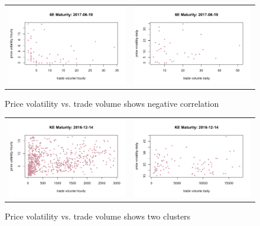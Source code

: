 \documentclass[12pt]{article}
\begin{document}
\begin{figure}[H]
	\begin{center}
		\begin{tabular}{ll}
		\includegraphics[width=8cm]{6E2017-06-19hourly.png} &
		\includegraphics[width=8cm]{6E2017-06-19daily.png} \\
		\end{tabular}
	\end{center}
		\caption{Price volatility vs. trade volume shows negative correlation}
		\label{fig: 12}
\end{figure}

\begin{figure}[H]
	\begin{center}
		\begin{tabular}{ll}
			\includegraphics[width=8cm]{KE2016-12-14hourly.png} &
			\includegraphics[width=8cm]{KE2016-12-14daily.png} \\
		\end{tabular}
	\end{center}
	\caption{Price volatility vs. trade volume shows two clusters}
	\label{fig: 13}
\end{figure}
\end{document}
